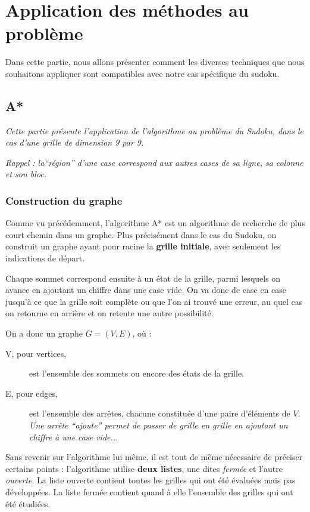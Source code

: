 \chapter{Application des méthodes au problème}
    Dans cette partie, nous allons présenter comment les diverses techniques que nous souhaitons appliquer sont compatibles avec notre cas spécifique du sudoku.
    \section{A*}

 \textit{Cette partie présente l'application de l'algorithme au problème du Sudoku, dans le cas d'une grille de dimension 9 par 9.}
   
\textit{   Rappel : la``région'' d'une case correspond aux autres cases de sa ligne, sa colonne et son bloc.
   }
     
  \subsection{Construction du graphe}
    
   
    Comme vu précédemment, l'algorithme A* est un algorithme de recherche de plus court chemin dans un graphe. Plus précisément dans le cas du Sudoku, on construit un graphe ayant pour racine la \textbf{grille initiale}, avec seulement les indications de départ.
    
    Chaque sommet correspond ensuite à un état de la grille, parmi lesquels on avance en ajoutant un chiffre dans une case vide. On va donc de case en case jusqu'à ce que la grille soit complète ou que l'on ai trouvé une erreur, au quel cas on retourne en arrière et on retente une autre possibilité.
    
   On a donc un graphe $G = (V,E)$, où : 
   
\begin{description} 
\item[V, pour vertices,] est l'ensemble des sommets ou encore des états de la grille.

 \item[E, pour edges,] est l'ensemble des arrêtes, chacune constituée d'une paire d'éléments de $V$. \textit{Une arrête ``ajoute'' permet de passer de grille en grille en ajoutant un chiffre à une case vide...}

\end{description}
    
            \bigskip
            Sans revenir sur l'algorithme lui même, il est tout de même nécessaire de préciser certains points : l'algorithme utilise \textbf{deux listes}, une dites \textit{fermée} et l'autre \textit{ouverte}. La liste ouverte contient toutes les grilles qui ont été évaluées mais pas développées. La liste fermée contient quand à elle l'ensemble des grilles qui ont été étudiées.
            

